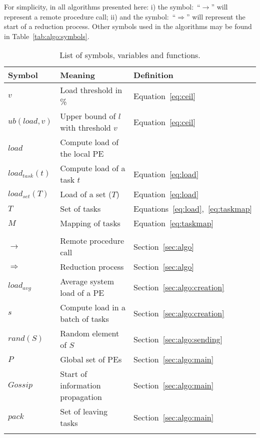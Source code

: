 For simplicity, in all algorithms presented here: i) the symbol:~``$\rightarrow$'' will represent a remote procedure call; ii) and the symbol:~``$\Rightarrow$'' will  represent the start of a reduction process.
Other symbols used in the algorithms may be found in Table~\ref{tab:algo:symbols}.


\begin{table}
	\caption{List of symbols, variables and functions.}
	\begin{tabular}{l | l | l }
		Symbol & Meaning & Definition\\ \hline
		
		$v$				& Load threshold in \% 								& Equation~\ref{eq:ceil} \\
		$ub(load,v)$		& Upper bound of $l$ with threshold $v$		 		& Equation~\ref{eq:ceil} \\
		$load$			& Compute load of the local PE \\
		$load_{task}(t)$	& Compute load of a task $t$							& Equation~\ref{eq:load}	\\
		$load_{set}(T)$	& Load of a set ($T$) 								& Equation~\ref{eq:load} \\
		$T$				& Set of tasks 										& Equations~\ref{eq:load},~\ref{eq:taskmap} \\		
		$M$				& Mapping of tasks									& Equation~\ref{eq:taskmap} \\
		& &\\	

		$\rightarrow$ 	& Remote procedure call 								& Section~\ref{sec:algo} \\
		$\Rightarrow$ 	& Reduction process 									& Section~\ref{sec:algo} \\
		$load_{avg}$		& Average system load of a PE 						& Section~\ref{sec:algo:creation}\\ 
		$s$			  	& Compute load in a batch of tasks 					& Section~\ref{sec:algo:creation} \\
		$rand(S)$		& Random element of $S$ 								& Section~\ref{sec:algo:sending} \\
		$P$				& Global set of PEs 									& Section~\ref{sec:algo:main} \\
		$Gossip$			& Start of information propagation					& Section~\ref{sec:algo:main} \\		
		$pack$			& Set of leaving tasks								& Section~\ref{sec:algo:main} \\
		& &\\
				

\end{tabular}
\end{table}
